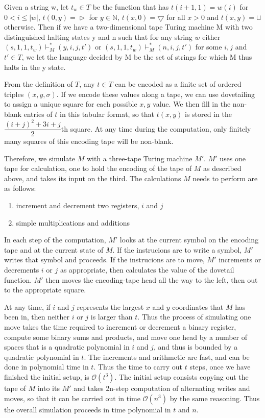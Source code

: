 \documentclass[12pt]{article}
\begin{document}
Given a string w, let $t_w\in T$ be the function that has $t(i+1, 1) = w(i)$ for $0 < i \leq |w|$, $t(0, y) = \vartriangleright$ for $y\in \mathbb{N} $, $t(x, 0) = \bigtriangledown$ for all $x > 0$ and $t(x, y) = \sqcup$ otherwise. Then if we have a two-dimensional tape Turing machine M with two distinguished halting states y and n such that for any string $w$ either $(s, 1, 1, t_w) \vdash^*_M (y, i, j, t')$ or $(s, 1, 1, t_w) \vdash^*_M (n, i, j, t')$ for some $i, j$ and $t'\in T$, we let the language decided by M be the set of strings for which M thus halts in the y state.

From the definition of $T$, any $t \in T$ can be encoded as a finite set of ordered triples $(x, y, \sigma)$. If we encode these values along a tape, we can use dovetailing to assign a unique square for each possible $x, y$ value. We then fill in the non-blank entries of $t$ in this tabular format, so that $t(x, y)$ is stored in the $\dfrac{(i+j)^2+3i+j}{2}$th square. At any time during the computation, only finitely many squares of this encoding tape will be non-blank.

Therefore, we simulate $M$ with a three-tape Turing machine $M'$. $M'$ uses one tape for calculation, one to hold the encoding of the tape of $M$ as described above, and takes its input on the third. The calculations $M$ needs to perform are as follows:
\begin{enumerate}
    \item increment and decrement two registers, $i$ and $j$
    \item simple multiplications and additions
\end{enumerate}

In each step of the computation, $M'$ looks at the current symbol on the encoding tape and at the current state of $M$. If the instrucions are to write a symbol, $M'$ writes that symbol and proceeds. If the instrucions are to move, $M'$ increments or decrements $i$ or $j$ as appropriate, then calculates the value of the dovetail function. $M'$ then moves the encoding-tape head all the way to the left, then out to the appropriate square.

At any time, if $i$ and $j$ represents the largest $x$ and $y$ coordinates that $M$ has been in, then neither $i$ or $j$ is larger than $t$. Thus the process of simulating one move takes the time required to increment or decrement a binary register, compute some binary sums and products, and move one head by a number of spaces that is a quadratic polynomial in $i$ and $j$, and thus is bounded by a quadratic polynomial in $t$. The increments and arithmetic are fast, and can be done in polynomial time in $t$. Thus the time to carry out $t$ steps, once we have finished the initial setup, is $\mathcal{O}(t^3)$. The initial setup consists copying out the tape of $M$ into its $M'$ and takes 2n-step computation of alternating writes and moves, so that it can be carried out in time $\mathcal{O}(n^3)$ by the same reasoning. Thus the overall simulation proceeds in time polynomial in $t$ and $n$.
\end{document}
